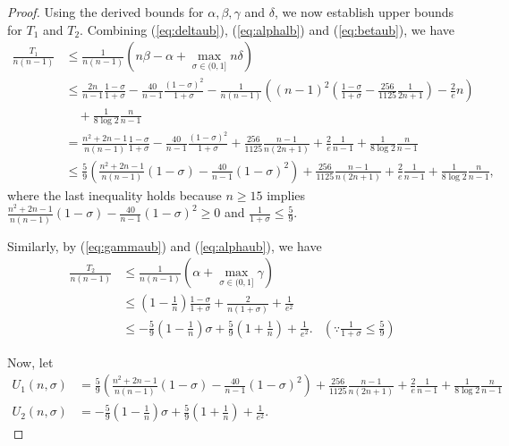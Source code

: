 \documentclass{article}
\theoremstyle{plain}
\theoremstyle{definition}
\theoremstyle{remark}
\def\bigopen#1{\left(#1\right)}
\begin{document}
\begin{proof}
Using the derived bounds for $\alpha,\beta,\gamma$ and $\delta$, we now establish upper bounds for $T_1$ and $T_2$. Combining (\ref{eq:deltaub}), (\ref{eq:alphalb}) and (\ref{eq:betaub}), we have
\begin{align*}
    \frac{T_1}{n(n-1)} &\le \frac{1}{n(n-1)} (n\beta -\alpha + \max_{\sigma \in (0, 1]} n\delta)\\
    &\le \frac{2n}{n-1} \frac{1-\sigma}{1+\sigma} - \frac{40}{n-1} \frac{(1-\sigma)^2}{1+\sigma} - \frac{1}{n(n-1)} \bigopen{ (n-1)^2 \bigopen{\frac{1-\sigma}{1+\sigma}-\frac{256}{1125} \frac{1}{2n+1}} - \frac{2}{e}n} \\
    &\quad + \frac{1}{8 \log 2} \frac{n}{n-1} \\
    &= \frac{n^2+2n-1}{n(n-1)} \frac{1-\sigma}{1+\sigma} - \frac{40}{n-1} \frac{(1-\sigma)^2}{1+\sigma} + \frac{256}{1125} \frac{n-1}{n(2n+1)} + \frac{2}{e} \frac{1}{n-1}+ \frac{1}{8 \log 2} \frac{n}{n-1} \\
    &\le \frac{5}{9} \bigopen{\frac{n^2+2n-1}{n(n-1)} (1-\sigma) - \frac{40}{n-1}(1-\sigma)^2} + \frac{256}{1125} \frac{n-1}{n(2n+1)} + \frac{2}{e} \frac{1}{n-1}+ \frac{1}{8 \log 2} \frac{n}{n-1},
\end{align*}
where the last inequality holds because $n\ge 15$ implies $\frac{n^2+2n-1}{n(n-1)} (1-\sigma) - \frac{40}{n-1}(1-\sigma)^2 \ge 0$ and $\frac{1}{1+\sigma} \le \frac{5}{9}$.

Similarly, by (\ref{eq:gammaub}) and (\ref{eq:alphaub}), we have 
\begin{align*}
    \frac{T_2}{n(n-1)} &\le \frac{1}{n(n-1)} (\alpha + \max_{\sigma \in (0, 1]} \gamma) \\
    &\le \bigopen{1-\frac{1}{n}} \frac{1-\sigma}{1+\sigma}+\frac{2}{n(1+\sigma)} + \frac{1}{e^2} \\
    &\le -\frac{5}{9}\bigopen{1-\frac{1}{n}}\sigma + \frac{5}{9}\bigopen{1+\frac{1}{n}} + \frac{1}{e^2}. & \bigopen{\because \frac{1}{1+\sigma} \le \frac{5}{9}}
\end{align*}

Now, let 
\begin{align*}
    U_1(n, \sigma) &= \frac{5}{9} \bigopen{\frac{n^2+2n-1}{n(n-1)} (1-\sigma) - \frac{40}{n-1}(1-\sigma)^2} + \frac{256}{1125} \frac{n-1}{n(2n+1)} + \frac{2}{e} \frac{1}{n-1}+ \frac{1}{8 \log 2} \frac{n}{n-1} \\
    U_2(n, \sigma) &= -\frac{5}{9}\bigopen{1-\frac{1}{n}}\sigma + \frac{5}{9}\bigopen{1+\frac{1}{n}} + \frac{1}{e^2}.
\end{align*}


\end{proof}
\end{document}
